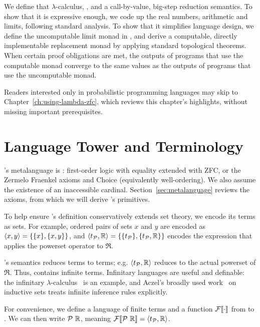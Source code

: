 We define that $\lambda$-calculus, \targetlang, and a call-by-value, big-step reduction semantics. To show that it is expressive enough, we code up the real numbers, arithmetic and limits, following standard analysis. To show that it simplifies language design, we define the uncomputable limit monad in \targetlang, and derive a computable, directly implementable replacement monad by applying standard topological theorems. When certain proof obligations are met, the outputs of programs that use the computable monad converge to the same values as the outputs of programs that use the uncomputable monad.

Readers interested only in probabilistic programming languages may skip to Chapter~\ref{ch:using-lambda-zfc}, which reviews this chapter's highlights, without missing important prerequisites.


\section{Language Tower and Terminology}

\targetlang's metalanguage is : first-order logic with equality extended with ZFC, or the Zermelo Fraenkel axioms and Choice (equivalently well-ordering). We also assume the existence of an inaccessible cardinal. Section~\ref{sec:metalanguage} reviews the axioms, from which we will derive \targetlang's primitives.

To help ensure \targetlang's definition conservatively extends set theory, we encode its terms as sets. For example, ordered pairs of sets $x$ and $y$ are encoded as $\langle{x,y}\rangle = \{{\{{x}\},\{{x,y}\}}\}$, and $\langle{t_{\mathcal{P}},\mathbb{R}}\rangle = \{{\{{t_{\mathcal{P}}}\},\{{t_{\mathcal{P}},\mathbb{R}}\}}\}$ encodes the expression that applies the powerset operator to $\Re$.

\targetlang's semantics reduces terms to terms; e.g. $\langle{t_{\mathcal{P}},\mathbb{R}}\rangle$ reduces to the actual powerset of $\Re$.
Thus, \targetlang contains infinite terms.
Infinitary languages are useful and definable: the infinitary $\lambda$-calculus~\cite{cit:kennaway-1996-inf-lc} is an example, and Aczel's broadly used work~\cite{cit:aczel-1977-inductive} on inductive sets treats infinite inference rules explicitly.

For convenience, we define a language \ftargetlang of finite terms and a function $\mathcal{F}\!\left\llbracket{\cdot}\right\rrbracket$ from \ftargetlang to \targetlang. We can then write $\mathcal{P}~\mathbb{R}$, meaning $\mathcal{F}\!\left\llbracket{\mathcal{P}~\mathbb{R}}\right\rrbracket = \langle{t_{\mathcal{P}},\mathbb{R}}\rangle$.

